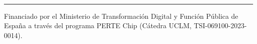 \begin{titlepage}
\makeatletter
  \vspace*{3cm}

  \begin{center}
    {\Large\textbf{\@title}}\\

    \vspace*{0.3cm}
    \rule{8cm}{0.5mm}

    \begin{Large}\textbf{\@docType}\end{Large}    
  \end{center}

  \vspace*{\fill} 

    \noindent Financiado por el Ministerio de Transformación Digital y Función Pública de España a través del programa PERTE Chip (Cátedra UCLM, TSI-069100-2023-0014).

  \begin{figure}[b]    
    \begin{centering}
    \captionsetup[subfigure]{labelformat=empty} 
    \hspace{0.25em}
    \hspace{0.25em}
    \end{centering}
  \end{figure}


  \emptyPage
\makeatother
\end{titlepage}
